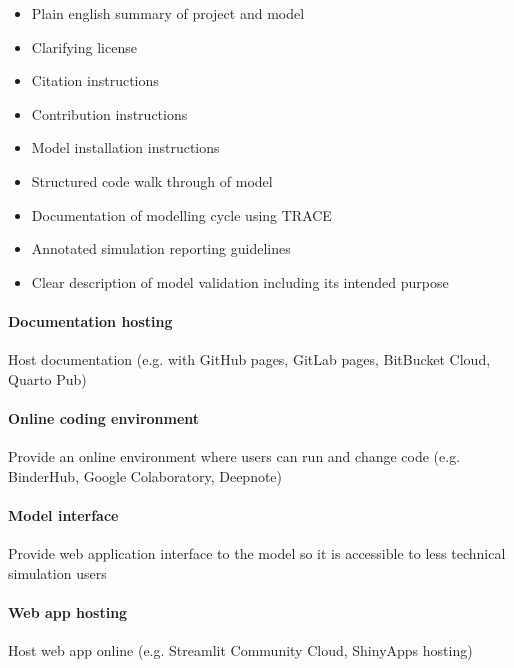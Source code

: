 \documentclass[
]{article}
\providecommand{\tightlist}{%
  \setlength{\itemsep}{0pt}\setlength{\parskip}{0pt}}
\begin{document}
\begin{itemize}
\tightlist
\item
  Plain english summary of project and model
\item
  Clarifying license
\item
  Citation instructions
\item
  Contribution instructions
\item
  Model installation instructions
\item
  Structured code walk through of model
\item
  Documentation of modelling cycle using TRACE
\item
  Annotated simulation reporting guidelines
\item
  Clear description of model validation including its intended purpose
\end{itemize}

\paragraph{Documentation hosting}

Host documentation (e.g. with GitHub pages, GitLab pages, BitBucket
Cloud, Quarto Pub)

\paragraph{Online coding environment}

Provide an online environment where users can run and change code (e.g.
BinderHub, Google Colaboratory, Deepnote)

\paragraph{Model interface}

Provide web application interface to the model so it is accessible to
less technical simulation users

\paragraph{Web app hosting}

Host web app online (e.g. Streamlit Community Cloud, ShinyApps hosting)
\end{document}

